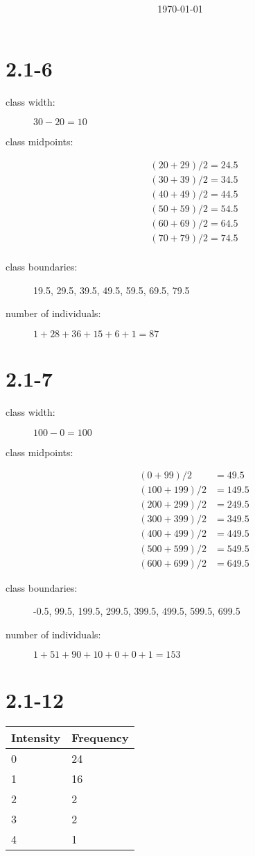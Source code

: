 \documentclass[fleqn, 12pt]{article}
\title{\classdescription\ \\ \classname\ \\ $\ $ \\ \assignment}
\author{\authorname}
\date{\today}
\newcommand{\chapter}{2.1}
\newcommand{\problem}[1]{\vspace{5ex}\section*{\chapter-#1}}
\newcommand{\thead}[1]{\textnormal{\textbf{#1}}}
\begin{document}
\maketitle

\problem{6}
\begin{description}
\item[class width:] $30 - 20 = 10$
\item[class midpoints:] \phantom{1}
  \[
    \begin{split}
    (20 + 29) / 2 = 24.5 \\
    (30 + 39) / 2 = 34.5 \\
    (40 + 49) / 2 = 44.5 \\
    (50 + 59) / 2 = 54.5 \\
    (60 + 69) / 2 = 64.5 \\
    (70 + 79) / 2 = 74.5 \\
  \end{split}
  \]
\item[class boundaries:] 19.5, 29.5, 39.5, 49.5, 59.5, 69.5, 79.5
\item[number of individuals:] $1 + 28 + 36 + 15 + 6 + 1 = 87$

\end{description}


\problem{7}
\begin{description}
\item[class width:] $100 - 0 = 100$
\item[class midpoints:] \phantom{1}
  \[
  \begin{split}
  (0 + 99) / 2 &= 49.5 \\
  (100 + 199) / 2 &= 149.5 \\
  (200 + 299) / 2 &= 249.5 \\
  (300 + 399) / 2 &= 349.5 \\
  (400 + 499) / 2 &= 449.5 \\
  (500 + 599) / 2 &= 549.5 \\
  (600 + 699) / 2 &= 649.5
  \end{split}
  \]
\item[class boundaries:] -0.5, 99.5, 199.5, 299.5, 399.5, 499.5, 599.5, 699.5
\item[number of individuals:] $1 + 51 + 90 + 10 + 0 + 0 + 1 = 153$
\end{description}

\problem{12}
\begin{tabular}{@{}ll@{}}
  \thead{Intensity} & \thead{Frequency} \\
  \toprule
  0 & 24 \\
  1 & 16 \\
  2 & 2 \\
  3 & 2 \\
  4 & 1 \\
  \bottomrule
\end{tabular}
\end{document}
